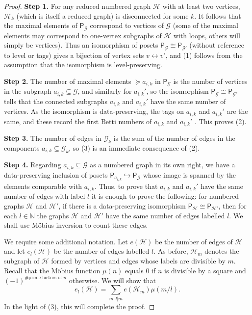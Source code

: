 \documentclass[11pt, a4 paper]{amsart}
\numberwithin{equation}{section}
\theoremstyle{remark}
\theoremstyle{definition}
\def\N{\mathbb N}
\def\st{\colon} %
\begin{document}
\begin{proof}
	\textbf{Step 1.}  For any reduced numbered graph $\mathcal{H}$ with at least two vertices, 
	$\mathcal{H}_k$ (which is itself a reduced graph)  is disconnected for some $k$. It follows that 
	the maximal elements of $\mathsf{P}_\mathcal{G}$ correspond to vertices of $\mathcal{G}$ (some
	of the maximal elements may correspond to one-vertex subgraphs of $\mathcal{H}$ with loops, others
	will simply be vertices). Thus an isomorphism of posets $\mathsf{P}_\mathcal{G}\cong\mathsf{P}_{\mathcal{G}'}$
	(without reference to level or tags) gives a bijection of vertex sets $v\leftrightarrow v'$, and (1) follows from the
	assumption that the isomorphism is level-preserving. 
	
	\textbf{Step 2.}  
	The number of maximal elements $\succeq a_{i, k}$ in $\mathsf{P}_\mathcal{G}$ is the
	number of vertices in the subgraph $a_{i,k}\subseteq\mathcal{G}$, and similarly for $a_{i,k}'$,
	so the isomorphism $\mathsf{P}_\mathcal{G}\cong\mathsf{P}_{\mathcal{G}'}$ tells that the connected subgraphs
	$a_{i, k}$ and $a_{i, k}'$ have the same number of 
	vertices.  As the isomorphism  is data-preserving, the tags on $a_{i, k}$ and $a_{i, k}'$ are the same, and 
	these record the  first Betti numbers of $a_{i, k}$ and $a_{i, k}'$ . This proves (2). 
	
	\textbf{Step 3.} The number of edges in $\mathcal{G}_k$ is the sum of the number of edges in 
	the components $a_{i,k}\subseteq\mathcal{G}_k$, so (3) is an immediate consequence of (2).
	
	\textbf{Step 4.}
	Regarding $a_{i,k}\subseteq \mathcal{G}$ 
	as a numbered graph in its own right, 
	we have a data-preserving inclusion of posets 
	$\mathsf{P}_{a_{i,k}} \hookrightarrow \mathsf{P}_\mathcal{G}$
	whose image is spanned by the elements comparable with $a_{i,k}$.
	Thus, to prove  that $a_{i,k}$ and $a_{i,k}'$
	have the same number of edges with label $l$
	it is enough to prove the following:
	for numbered graphs $\mathcal{H}$ and $\mathcal{H}'$, if there is a data-preserving isomorphism 
	$\mathsf{P}_\mathcal{H}\cong \mathsf{P}_{\mathcal{H}'}$, then
	for each $l\in\N$ the graphs $\mathcal{H}$ and $\mathcal{H}'$
	have the same number of edges labelled $l$.
	We shall use M\"{o}bius inversion to count these edges.
	
	We require some additional notation. 
	Let  $e(\mathcal{H})$ be
	the number of edges of  $\mathcal{H}$
	and let $e_l(\mathcal{H})$ be
	the number of edges   labelled $l$.
	As before, $\mathcal{H}_m$ denotes
	the subgraph of $\mathcal{H}$
	formed by vertices and edges
	whose labels are divisible by $m$.
	Recall that the M\"{o}bius function $\mu(n)$  
	equals $0$ if $n$ is divisible by a square
	and $(-1)^{\# \text{prime factors of }n}$ otherwise.
	We will show that
	\begin{equation*}
		e_l(\mathcal{H}) = \sum_{m \st l|m} e(\mathcal{H}_m) \mu(m/l).
	\end{equation*}
	In the light of (3), this  will complete the proof.
	

\end{proof}
\end{document}
